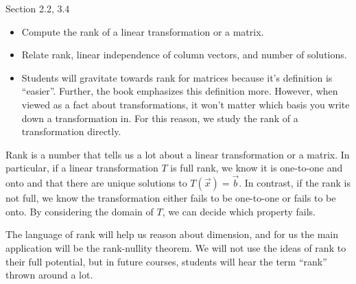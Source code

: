 \begin{lesson}

	Section 2.2, 3.4

	\begin{itemize}
		\item Compute the rank of a linear transformation or a matrix.
		\item Relate rank, linear independence of column vectors, and number of solutions.
	\end{itemize}

	\begin{annotation}
		\begin{notes}
			\begin{itemize}
				\item Students will gravitate towards rank for matrices because it's definition
					is ``easier''. Further, the book emphasizes this definition more. However,
					when viewed as a fact about transformations, it won't matter which
					basis you write down a transformation in. For this reason, we study the
					rank of a transformation directly.
			\end{itemize}
		\end{notes}
	\end{annotation}
	Rank is a number that tells us a lot about a linear transformation or a matrix. In particular,
	if a linear transformation $T$ is full rank, we know it is one-to-one and onto and that there are unique
	solutions to $T(\vec x)=\vec b$. In contrast, if the rank is not full, we know the transformation either fails to be
	one-to-one or fails to be onto. By considering the domain of $T$, we can decide which property fails.

	The language of rank will help us reason about dimension, and for us the main application will be the
	rank-nullity theorem. We will not use the ideas of rank to their full potential, but in
	future courses, students will hear the term ``rank'' thrown around a lot.

\end{lesson}
	\bookonlynewpage

